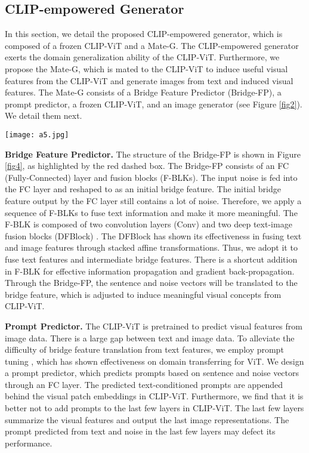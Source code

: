 \documentclass[10pt,twocolumn,letterpaper]{article}
\begin{document}
\subsection{CLIP-empowered Generator}
In this section, we detail the proposed CLIP-empowered generator, which is composed of a frozen CLIP-ViT and a Mate-G.
The CLIP-empowered generator exerts the domain generalization ability of the CLIP-ViT.
Furthermore, we propose the Mate-G, which is mated to the CLIP-ViT to induce useful visual features from the CLIP-ViT and generate images from text and induced visual features.
The Mate-G consists of a Bridge Feature Predictor (Bridge-FP), a prompt predictor, a frozen CLIP-ViT, and an image generator (see Figure \ref{fig2}). 
We detail them next.

\begin{figure*}[t]
  \centering
  \texttt{[image: a5.jpg]}
  \caption{The architecture of the proposed CLIP-empowered generator for text-to-image synthesis. Armed with bridge feature predictor and prompt predictor, it can induce meaningful visual concepts from the frozen CLIP-ViT for image synthesis.}
  \label{fig4}
  \vspace{-0.4cm}
\end{figure*}

\noindent \textbf{Bridge Feature Predictor.} The structure of the Bridge-FP is shown in Figure \ref{fig4}, as highlighted by the red dashed box.
The Bridge-FP consists of an FC (Fully-Connected) layer and  fusion blocks (F-BLKs).
The input noise is fed into the FC layer and reshaped to  as an initial bridge feature.
The initial bridge feature output by the FC layer still contains a lot of noise. 
Therefore, we apply a sequence of F-BLKs to fuse text information and make it more meaningful.
The F-BLK is composed of two convolution layers (Conv) and two deep text-image fusion blocks (DFBlock) \cite{tao2020df}.
The DFBlock has shown its effectiveness in fusing text and image features through stacked affine transformations.
Thus, we adopt it to fuse text features and intermediate bridge features.
There is a shortcut addition in F-BLK for effective information propagation and gradient back-propagation.
Through the Bridge-FP, the sentence and noise vectors will be translated to the bridge feature, which is adjusted to induce meaningful visual concepts from CLIP-ViT.


\noindent \textbf{Prompt Predictor.} The CLIP-ViT is pretrained to predict visual features from image data.
There is a large gap between text and image data.
To alleviate the difficulty of bridge feature translation from text features, we employ prompt tuning \cite{jia2022visual}, which has shown effectiveness on domain transferring for ViT.
We design a prompt predictor, which predicts prompts based on sentence and noise vectors through an FC layer.
The predicted text-conditioned prompts are appended behind the visual patch embeddings in CLIP-ViT.
Furthermore, we find that it is better not to add prompts to the last few layers in CLIP-ViT. 
The last few layers summarize the visual features and output the last image representations. 
The prompt predicted from text and noise in the last few layers may defect its performance.
\end{document}

